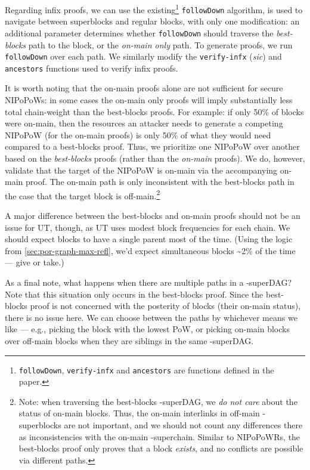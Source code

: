 Regarding infix proofs, we can use the existing\footnote{\texttt{followDown}, \texttt{verify-infx} and \texttt{ancestors} are functions defined in the \citeNIPoPoWs{} paper.} \texttt{followDown} algorithm, is used to navigate between superblocks and regular blocks, with only one modification: an additional parameter determines whether \texttt{followDown} should traverse the \emph{best-blocks} path to the block, or the \emph{on-main only} path.
To generate proofs, we run \texttt{followDown} over each path.
We similarly modify the \texttt{verify-infx} (\emph{sic}) and \texttt{ancestors} functions used to verify infix proofs.


It is worth noting that the on-main proofs alone are not sufficient for secure NIPoPoWs: in some cases the on-main only proofs will imply substantially less total chain-weight than the best-blocks proofs.
For example: if only 50\% of blocks were on-main, then the resources an attacker needs to generate a competing NIPoPoW (for the on-main proofs) is only 50\% of what they would need compared to a best-blocks proof.
Thus, we prioritize one NIPoPoW over another based on the \emph{best-blocks} proofs (rather than the \emph{on-main} proofs).
We do, however, validate that the target of the NIPoPoW is on-main via the accompanying on-main proof.
The on-main path is only inconsistent with the best-blocks path in the case that the target block is off-main.\footnote{
    Note: when traversing the best-blocks \mu-superDAG, we \emph{do not care} about the status of on-main blocks.
    Thus, the on-main interlinks in off-main \mu-superblocks are not important, and we should not count any differences there as inconsistencies with the on-main \mu-superchain.
    Similar to NIPoPoWRs, the best-blocks proof only proves that a block \emph{exists}, and no conflicts are possible via different paths.
}

A major difference between the best-blocks and on-main proofs should not be an issue for UT, though, as UT uses modest block frequencies for each chain.
We should expect blocks to have a single parent most of the time.
(Using the logic from \autoref{sec:por-graph-max-refl}, we'd expect simultaneous blocks \sim 2\% of the time --- give or take.)

As a final note, what happens when there are multiple paths in a \mu-superDAG?
Note that this situation only occurs in the best-blocks proof.
Since the best-blocks proof is not concerned with the posterity of blocks (their on-main status), there is no issue here.
We can choose between the paths by whichever means we like --- e.g., picking the block with the lowest PoW, or picking on-main blocks over off-main blocks when they are siblings in the same \mu-superDAG.

